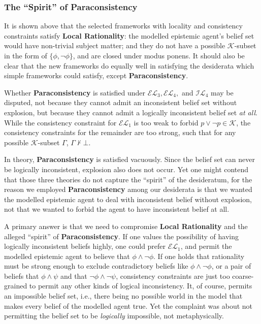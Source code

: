 \documentclass[12pt]{article}
\newcommand{\K}{\mathcal{K}}
\begin{document}
\subsubsection{The ``Spirit'' of Paraconsistency}
It is shown above that the selected frameworks with locality and consistency constraints satisfy \textbf{Local Rationality}: the modelled epistemic agent's belief set would have non-trivial subject matter; and they do not have a possible $\K$-subset in the form of $\{\phi, \lnot \phi \}$, and are closed under modus ponens. It should also be clear that the new frameworks do equally well in satisfying the desiderata which simple frameworks could satisfy, except \textbf{Paraconsistency}.
\par
Whether \textbf{Paraconsistency} is satisfied under $\mathcal{EL}_3, \mathcal{EL}_4,$ and $\mathcal{IL}_4$ may be disputed, not because they cannot admit an inconsistent belief set without explosion, but because they cannot admit a logically inconsistent belief set \textit{at all}. While the consistency constraint for $\mathcal{EL}_1$ is too weak to forbid $p \lor \lnot p \in \K$, the consistency constraints for the remainder are too strong, such that for any possible $\K$-subset $\Gamma$, $\Gamma \nvdash \bot$. 
\par
In theory, \textbf{Paraconsistency} is satisfied vacuously. Since the belief set can never be logically inconsistent, explosion also does not occur. Yet one might contend that those three theories do not capture the ``spirit'' of the desideratum, for the reason we employed \textbf{Paraconsistency} among our desiderata is that we wanted the modelled epistemic agent to deal with inconsistent belief without explosion, not that we wanted to forbid the agent to have inconsistent belief at all. 
\par
A primary answer is that we need to compromise \textbf{Local Rationality} and the alleged ``spirit'' of \textbf{Paraconsistency}. If one values the possibility of having logically inconsistent beliefs highly, one could prefer $\mathcal{EL}_1$, and permit the modelled epistemic agent to believe that $\phi \land \lnot \phi$. If one holds that rationality must be strong enough to exclude contradictory beliefs like $\phi \land \lnot \phi$, or a pair of beliefs that $\phi \land \psi$ and that $\lnot \phi \land \lnot \psi$, consistency constraints are just too coarse-grained to permit any other kinds of logical inconsistency. It, of course, permits an impossible belief set, i.e., there being no possible world in the model that makes every belief of the modelled agent true. Yet the complaint was about not permitting the belief set to be \textit{logically} impossible, not metaphysically.   
\end{document}
